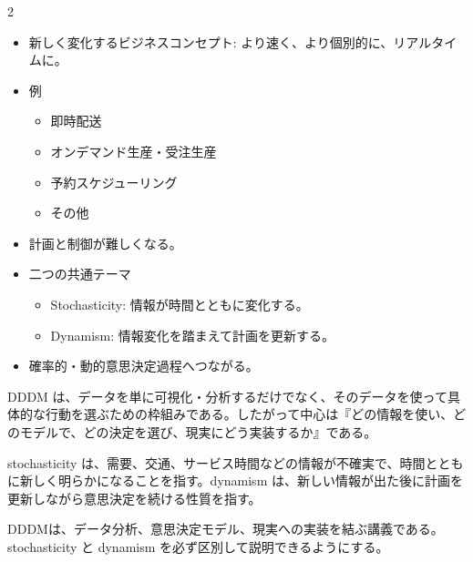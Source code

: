
\vspace{1.5mm}

\begin{multicols}{2}

\footnotesize

\raggedcolumns


\begin{itemize}
\item 新しく変化するビジネスコンセプト: より速く、より個別的に、リアルタイムに。
\item 例
\begin{itemize}
\item 即時配送
\item オンデマンド生産・受注生産
\item 予約スケジューリング
\item その他
\end{itemize}
\item 計画と制御が難しくなる。
\item 二つの共通テーマ
\begin{itemize}
\item Stochasticity: 情報が時間とともに変化する。
\item Dynamism: 情報変化を踏まえて計画を更新する。
\end{itemize}
\item 確率的・動的意思決定過程へつながる。
\end{itemize}

DDDM は、データを単に可視化・分析するだけでなく、そのデータを使って具体的な行動を選ぶための枠組みである。したがって中心は『どの情報を使い、どのモデルで、どの決定を選び、現実にどう実装するか』である。\par

stochasticity は、需要、交通、サービス時間などの情報が不確実で、時間とともに新しく明らかになることを指す。dynamism は、新しい情報が出た後に計画を更新しながら意思決定を続ける性質を指す。\par

DDDMは、データ分析、意思決定モデル、現実への実装を結ぶ講義である。stochasticity と dynamism を必ず区別して説明できるようにする。\par


\end{multicols}

